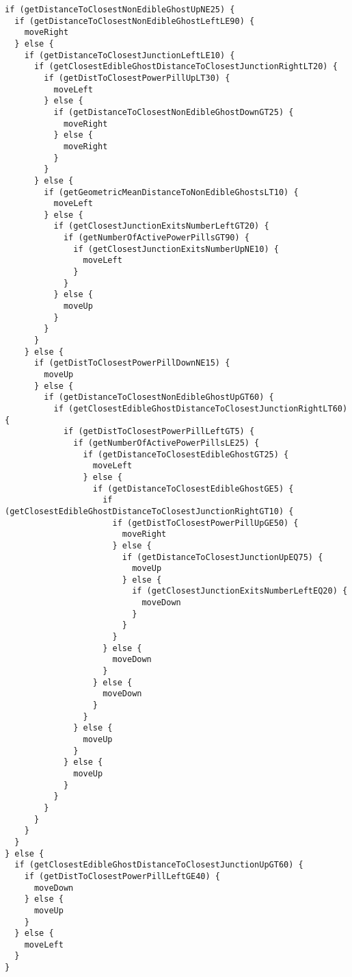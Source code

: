 \begin{lstlisting}[frame=single, breaklines=no, basicstyle=\fontsize{10}{11}\ttfamily, caption={Ejemplo de bot típico producido usando la gramática de bajo nivel entrenado contra Random Ghosts.}, captionpos=b]
if (getDistanceToClosestNonEdibleGhostUpNE25) {
  if (getDistanceToClosestNonEdibleGhostLeftLE90) {
    moveRight
  } else {
    if (getDistanceToClosestJunctionLeftLE10) {
      if (getClosestEdibleGhostDistanceToClosestJunctionRightLT20) {
        if (getDistToClosestPowerPillUpLT30) {
          moveLeft
        } else {
          if (getDistanceToClosestNonEdibleGhostDownGT25) {
            moveRight
          } else {
            moveRight
          }
        }
      } else {
        if (getGeometricMeanDistanceToNonEdibleGhostsLT10) {
          moveLeft
        } else {
          if (getClosestJunctionExitsNumberLeftGT20) {
            if (getNumberOfActivePowerPillsGT90) {
              if (getClosestJunctionExitsNumberUpNE10) {
                moveLeft
              }
            }
          } else {
            moveUp
          }
        }
      }
    } else {
      if (getDistToClosestPowerPillDownNE15) {
        moveUp
      } else {
        if (getDistanceToClosestNonEdibleGhostUpGT60) {
          if (getClosestEdibleGhostDistanceToClosestJunctionRightLT60) {
            if (getDistToClosestPowerPillLeftGT5) {
              if (getNumberOfActivePowerPillsLE25) {
                if (getDistanceToClosestEdibleGhostGT25) {
                  moveLeft
                } else {
                  if (getDistanceToClosestEdibleGhostGE5) {
                    if (getClosestEdibleGhostDistanceToClosestJunctionRightGT10) {
                      if (getDistToClosestPowerPillUpGE50) {
                        moveRight
                      } else {
                        if (getDistanceToClosestJunctionUpEQ75) {
                          moveUp
                        } else {
                          if (getClosestJunctionExitsNumberLeftEQ20) {
                            moveDown
                          }
                        }
                      }
                    } else {
                      moveDown
                    }
                  } else {
                    moveDown
                  }
                }
              } else {
                moveUp
              }
            } else {
              moveUp
            }
          }
        }
      }
    }
  }
} else {
  if (getClosestEdibleGhostDistanceToClosestJunctionUpGT60) {
    if (getDistToClosestPowerPillLeftGE40) {
      moveDown
    } else {
      moveUp
    }
  } else {
    moveLeft
  }
}
\end{lstlisting}

